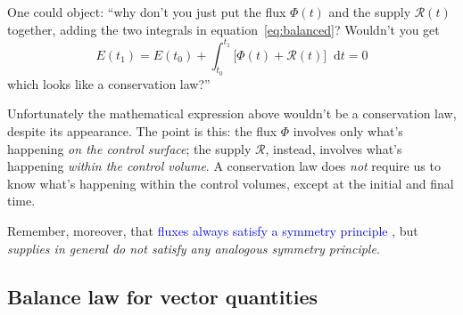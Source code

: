 \documentclass[a4paper,12pt,%
onecolumn,oneside,%
british%
]{memoir}
\newcommand*{\di}{\mathop{}\!\mathrm{d}}%
\renewcommand*{\|}[1][]{\nonscript\:#1\vert\nonscript\:\mathopen{}}
\newcommand*{\sect}{\S}%
\renewcommand*{\autoref}[3][\sect\,\ref]{\textcolor{blue}{#3}
\raisebox{0.6ex}{\color{blue}\miniscule%
\faIcon{angle-right}%
\;#1{#2}\;p.\,\pageref{#2}}}
\newcommand*{\yti}{t_{0}}
\newcommand*{\ytf}{t_{1}}
\newcommand*{\dt}{\di t}
\newcommand*{\yE}{E}
\newcommand*{\yH}{\varPhi}%
\newcommand*{\yR}{\mathcal{R}}%
\begin{document}
\begin{warning}
  One could object: \enquote{why don't you just put the flux $\yH(t)$ and the supply $\yR(t)$ together, adding the two integrals in equation~\eqref{eq:balanced}? Wouldn't you get
  \begin{equation*}
    \yE(\ytf) = \yE(\yti) + \int_{\yti}^{\ytf}\!\!\bigl[\yH(t)+\yR(t)\bigr]\dt = 0
  \end{equation*}
  which looks like a conservation law?}

\medskip

Unfortunately the mathematical expression above wouldn't be a conservation law, despite its appearance. The point is this: the flux $\yH$ involves only what's happening \emph{on the control surface}; the supply $\yR$, instead, involves what's happening \emph{within the control volume}. A conservation law does \emph{not} require us to know what's happening within the control volumes, except at the initial and final time.

\smallskip

Remember, moreover, that \autoref{def:symmetryflux}{fluxes always satisfy a symmetry principle}, but \emph{supplies in general do not satisfy any analogous symmetry principle}.
\end{warning}



\subsection{Balance law for vector quantities}
\label{sec:balance_laws_vect}
\end{document}
